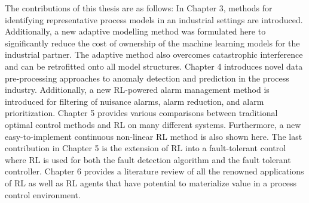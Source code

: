 The contributions of this thesis are as follows: In Chapter 3, methods for identifying representative process models in an industrial settings are introduced. Additionally, a new adaptive modelling method was formulated here to significantly reduce the cost of ownership of the machine learning models for the industrial partner. The adaptive method also overcomes catastrophic interference and can be retrofitted onto all model structures. Chapter 4 introduces novel data pre-processing approaches to anomaly detection and prediction in the process industry.  Additionally, a new RL-powered alarm management method is introduced for filtering of nuisance alarms, alarm reduction, and alarm prioritization.  Chapter 5 provides various comparisons between traditional optimal control methods and RL on many different systems. Furthermore, a new easy-to-implement continuous non-linear RL method is also shown here.  The last contribution in Chapter 5 is the extension of RL into a fault-tolerant control where RL is used for both the fault detection algorithm and the fault tolerant controller. Chapter 6 provides a literature review of all the renowned applications of RL as well as RL agents that have potential to materialize value in a process control environment.



% 


% 


% 



% 
